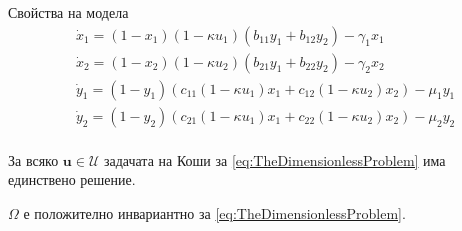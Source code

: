 \begin{frame}[t]{Свойства на модела}
  \begin{equation}
    \label{eq:TheDimensionlessProblem}
    \begin{split}
      &\dot{x}_1 = (1-x_1) (1-\kappa u_1) \left(b_{11} y_1 + b_{12} y_2\right) - \gamma_1 x_1 \\
      &\dot{x}_2 = (1-x_2) (1-\kappa u_2)\left(b_{21} y_1 + b_{22} y_2\right) - \gamma_2 x_2 \\
      &\dot{y}_1 = (1-y_1) \left(c_{11}(1-\kappa u_1) x_1 + c_{12}(1-\kappa u_2) x_2\right) - \mu_1 y_1 \\
      &\dot{y}_2 = (1-y_2) \left(c_{21}(1-\kappa u_1) x_1 + c_{22} (1-\kappa u_2) x_2\right) - \mu_2 y_2 \\
    \end{split}
  \end{equation}

  \begin{proposition}
    За всяко $\boldsymbol{u} \in \mathcal{U}$ задачата на Коши за \eqref{eq:TheDimensionlessProblem} има единствено решение.
  \end{proposition}


  \begin{proposition}
    $\Omega$ е положително инвариантно за \eqref{eq:TheDimensionlessProblem}.
  \end{proposition}

\end{frame}

